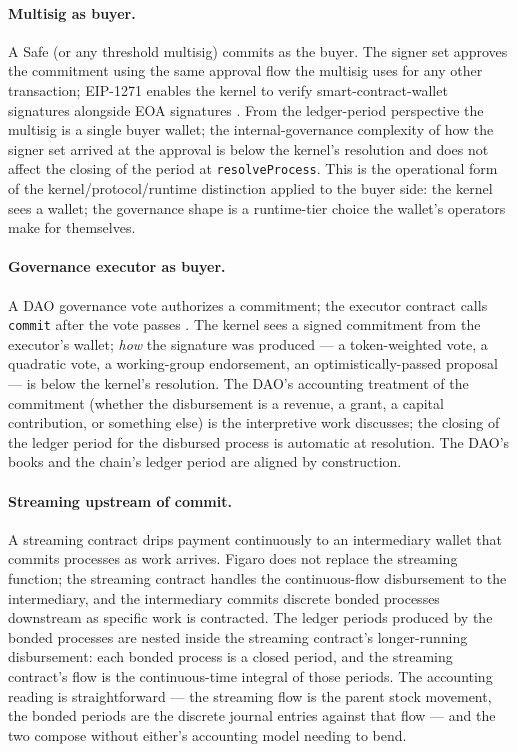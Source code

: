 \documentclass[11pt,a4paper]{article}
\theoremstyle{definition}
\theoremstyle{remark}
\begin{document}
\paragraph{Multisig as buyer.}
A Safe (or any threshold multisig) commits as the buyer. The
signer set approves the commitment using the same approval flow
the multisig uses for any other transaction; EIP-1271 enables
the kernel to verify smart-contract-wallet signatures alongside
EOA signatures
\citep{eip1271, safe_doc_2024}. From the ledger-period
perspective the multisig is a single buyer wallet; the
internal-governance complexity of how the signer set arrived at
the approval is below the kernel's resolution and does not affect
the closing of the period at \texttt{resolveProcess}. This is
the operational form of the kernel/protocol/runtime distinction
applied to the buyer side: the kernel sees a wallet; the
governance shape is a runtime-tier choice the wallet's operators
make for themselves.

\paragraph{Governance executor as buyer.}
A DAO governance vote authorizes a commitment; the executor
contract calls \texttt{commit} after the vote passes
\citep{compound_governor_2020, openzeppelin_governor_2024}. The
kernel sees a signed commitment from the executor's wallet;
\emph{how} the signature was produced --- a token-weighted vote,
a quadratic vote, a working-group endorsement, an
optimistically-passed proposal --- is below the kernel's resolution.
The DAO's accounting treatment of the commitment (whether the
disbursement is a revenue, a grant, a capital contribution, or
something else) is the interpretive work 
discusses; the closing of the ledger period for the disbursed
process is automatic at resolution. The DAO's books and the
chain's ledger period are aligned by construction.

\paragraph{Streaming upstream of commit.}
A streaming contract \citep{sablier_2023, superfluid_2023} drips
payment continuously to an intermediary wallet that commits
processes as work arrives. Figaro does not replace the streaming
function; the streaming contract handles the continuous-flow
disbursement to the intermediary, and the intermediary commits
discrete bonded processes downstream as specific work is
contracted. The ledger periods produced by the bonded processes
are nested inside the streaming contract's longer-running
disbursement: each bonded process is a closed period, and the
streaming contract's flow is the continuous-time integral of
those periods. The accounting reading is straightforward --- the
streaming flow is the parent stock movement, the bonded periods
are the discrete journal entries against that flow --- and the
two compose without either's accounting model needing to bend.
\end{document}
